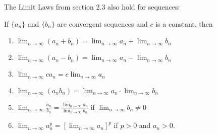 \begin{frame}
The Limit Laws from section 2.3 also hold for sequences:

If $\{ a_n\}$ and $\{ b_n\}$ are convergent sequences and $c$ is a constant, then
\begin{enumerate}
\item  $\displaystyle \lim_{n\to\infty}(a_n+b_n) = \lim_{n\to\infty}a_n +\lim_{n\to\infty}b_n$
\item  $\displaystyle \lim_{n\to\infty}(a_n-b_n) = \lim_{n\to\infty}a_n -\lim_{n\to\infty}b_n$
\item  $\displaystyle \lim_{n\to\infty}ca_n = c\lim_{n\to\infty}a_n$
\item  $\displaystyle \lim_{n\to\infty}(a_n b_n) = \lim_{n\to\infty}a_n \cdot \lim_{n\to\infty}b_n$
\item  $\displaystyle \lim_{n\to\infty}\frac{a_n}{ b_n} = \frac{\displaystyle \lim_{n\to\infty}a_n}{\displaystyle  \lim_{n\to\infty}b_n}$ if $\lim_{n\to\infty}b_n\neq 0$
\item  $\displaystyle \lim_{n\to\infty}a_n^p = \left[ \lim_{n\to\infty}a_n\right]^p$ if $p > 0$ and $a_n > 0$.
\end{enumerate}
\end{frame}
